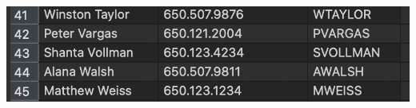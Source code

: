 \documentclass{article}
\begin{document}
\begin{enumerate}
\begin{center}
        \includegraphics*[scale=.3]{10.4.png}
    \end{center}
\end{enumerate}
\end{document}
